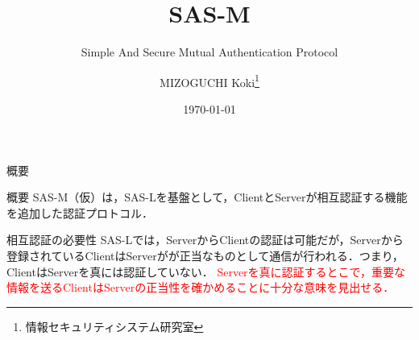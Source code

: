 \documentclass[t,aspectratio=169,12pt]{beamer}
\title[SAS-M]{SAS-M}
\subtitle{Simple And Secure Mutual Authentication Protocol}
\author[K.MIZOGUCHI]{MIZOGUCHI Koki\thanks{情報セキュリティシステム研究室}}
\date{\today}
\institute[KUT]{Kochi University of Technology}
\begin{document}
\begin{frame}
    \titlepage
\end{frame}
\begin{frame}{概要}
    \begin{block}{概要}
        SAS-M（仮）は，SAS-Lを基盤として，{\ttfamily Client}と{\ttfamily Server}が相互認証する機能を追加した認証プロトコル．
    \end{block}
    \begin{block}{相互認証の必要性}
        SAS-Lでは，{\ttfamily Server}から{\ttfamily Client}の認証は可能だが，{\ttfamily Server}から登録されている{\ttfamily Client}は{\ttfamily Server}がが正当なものとして通信が行われる．つまり，{\ttfamily Client}は{\ttfamily Server}を真には認証していない．
        \textcolor{red}{{\ttfamily Server}を真に認証するとこで，重要な情報を送る{\ttfamily Client}は{\ttfamily Server}の正当性を確かめることに十分な意味を見出せる．}
    \end{block}
\end{frame}
\end{document}
